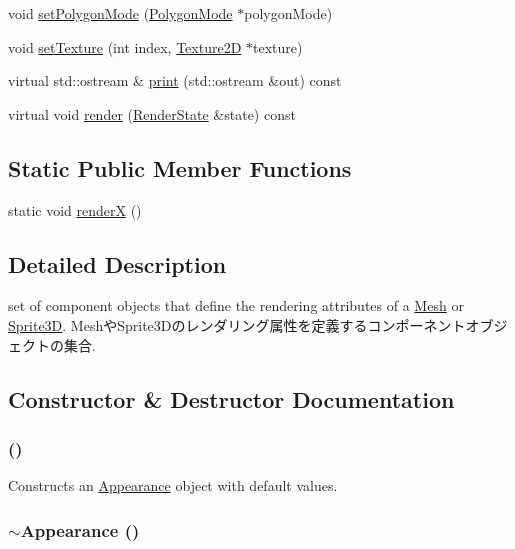\begin{CompactItemize}
\item 
void \hyperlink{classm3g_1_1Appearance_cc21fac7868e2ad37e689ac642db1aae}{setPolygonMode} (\hyperlink{classm3g_1_1PolygonMode}{PolygonMode} $\ast$polygonMode)
\item 
void \hyperlink{classm3g_1_1Appearance_493e54b1c7ab839b9e76b28e0629cf6a}{setTexture} (int index, \hyperlink{classm3g_1_1Texture2D}{Texture2D} $\ast$texture)
\item 
virtual std::ostream \& \hyperlink{classm3g_1_1Appearance_6fea17fa1532df3794f8cb39cb4f911f}{print} (std::ostream \&out) const 
\item 
virtual void \hyperlink{classm3g_1_1Appearance_8babc8a79b78615da51161e94029eea9}{render} (\hyperlink{structm3g_1_1RenderState}{RenderState} \&state) const 
\end{CompactItemize}
\subsection*{Static Public Member Functions}
\begin{CompactItemize}
\item 
static void \hyperlink{classm3g_1_1Appearance_443a7a301f77f625335ecc06d13bad06}{renderX} ()
\end{CompactItemize}


\subsection{Detailed Description}
set of component objects that define the rendering attributes of a \hyperlink{classm3g_1_1Mesh}{Mesh} or \hyperlink{classm3g_1_1Sprite3D}{Sprite3D}. MeshやSprite3Dのレンダリング属性を定義するコンポーネントオブジェクトの集合. 

\subsection{Constructor \& Destructor Documentation}
\hypertarget{classm3g_1_1Appearance_2e594c7b96cb5cfad839a98b57f5d42f}{
\subsubsection[{Appearance}]{ ()}}
\label{classm3g_1_1Appearance_2e594c7b96cb5cfad839a98b57f5d42f}


Constructs an \hyperlink{classm3g_1_1Appearance}{Appearance} object with default values. \hypertarget{classm3g_1_1Appearance_c05c93d7a0f286cb9471b6c667ffeee1}{
\subsubsection[{$\sim$Appearance}]{\setlength{\rightskip}{0pt plus 5cm}$\sim${\bf Appearance} ()}}
\label{classm3g_1_1Appearance_c05c93d7a0f286cb9471b6c667ffeee1}


